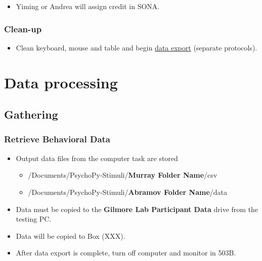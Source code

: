 \documentclass[]{article}
\providecommand{\tightlist}{%
  \setlength{\itemsep}{0pt}\setlength{\parskip}{0pt}}
\begin{document}
\begin{itemize}
\tightlist
\item
  Yiming or Andrea will assign credit in SONA.
\end{itemize}

\hypertarget{clean-up}{%
\subsubsection{Clean-up}\label{clean-up}}

\begin{itemize}
\tightlist
\item
  Clean keyboard, mouse and table and begin
  \href{sex-differences-data-export.md}{data export} (separate
  protocols).
\end{itemize}

\hypertarget{data-processing}{%
\section{Data processing}\label{data-processing}}

\hypertarget{gathering}{%
\subsection{Gathering}\label{gathering}}

\hypertarget{retrieve-behavioral-data}{%
\subsubsection{Retrieve Behavioral
Data}\label{retrieve-behavioral-data}}

\begin{itemize}
\tightlist
\item
  Output data files from the computer task are stored

  \begin{itemize}
  \tightlist
  \item
    /Documents/PsychoPy-Stimuli/\textbf{Murray Folder Name}/csv
  \item
    /Documents/PsychoPy-Stimuli/\textbf{Abramov Folder Name}/data
  \end{itemize}
\item
  Data must be copied to the \textbf{Gilmore Lab Participant Data} drive
  from the testing PC.
\item
  Data will be copied to Box (XXX).
\item
  After data export is complete, turn off computer and monitor in 503B.
\end{itemize}
\end{document}
